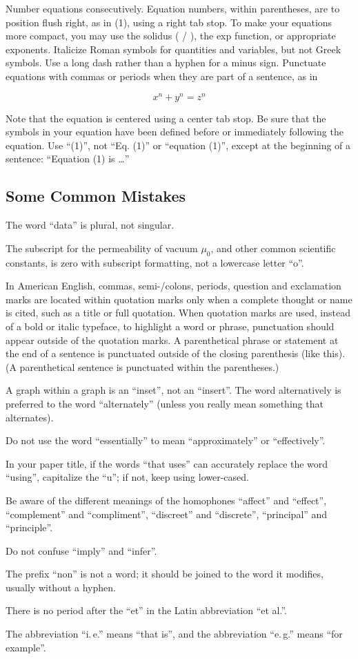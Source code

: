 \documentclass[conference,pbalance]{iaria}
\begin{document}
Number equations consecutively. Equation numbers, within parentheses, are to position flush right, as in (1), using a right tab stop. To make your equations more compact, you may use the solidus ( / ), the exp function, or appropriate exponents. Italicize Roman symbols for quantities and variables, but not Greek symbols. Use a long dash rather than a hyphen for a minus sign. Punctuate equations with commas or periods when they are part of a sentence, as in

\[ x^n + y^n = z^n \]

Note that the equation is centered using a center tab stop. Be sure that the symbols in your equation have been defined before or immediately following the equation. Use “(1)”, not “Eq. (1)” or “equation (1)”, except at the beginning of a sentence: “Equation (1) is \ldots”

\subsection{Some Common Mistakes}

\begin{compactitem}
\item The word “data” is plural, not singular.
\item The subscript for the permeability of vacuum $\mu_0$, and other common scientific constants, is zero with subscript formatting, not a lowercase letter “o”.
\item In American English, commas, semi-/colons, periods, question and exclamation marks are located within quotation marks only when a complete thought or name is cited, such as a title or full quotation. When quotation marks are used, instead of a bold or italic typeface, to highlight a word or phrase, punctuation should appear outside of the quotation marks. A parenthetical phrase or statement at the end of a sentence is punctuated outside of the closing parenthesis (like this). (A parenthetical sentence is punctuated within the parentheses.)
\item A graph within a graph is an “inset”, not an “insert”. The word alternatively is preferred to the word “alternately” (unless you really mean something that alternates).
\item Do not use the word “essentially” to mean “approximately” or “effectively”.
\item In your paper title, if the words “that uses” can accurately replace the word “using”, capitalize the “u”; if not, keep using lower-cased.
\item Be aware of the different meanings of the homophones “affect” and “effect”, “complement” and “compliment”, “discreet” and “discrete”, “principal” and “principle”.
\item Do not confuse “imply” and “infer”.
\item The prefix “non” is not a word; it should be joined to the word it modifies, usually without a hyphen.
\item There is no period after the “et” in the Latin abbreviation “et al.”.
\item The abbreviation “i.\,e.” means “that is”, and the abbreviation “e.\,g.” means “for example”.
\end{compactitem}
\end{document}
